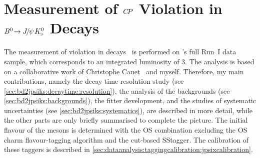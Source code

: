 
\chapter[Measurement of \texorpdfstring{$\CP$}{CP} Violation in
\texorpdfstring{$\BdToJPsiKS$}{Bd2JPsiKS} Decays]{Measurement of
\texorpdfstring{$\CP$}{CP} Violation in
\texorpdfstring{$\BdToJPsiKS$}{Bd2JPsiKS} Decays}
\label{sec:bd2jpsiks}

The measurement of \CP violation in \BdToJPsiKS
decays~\cite{LHCb-PAPER-2015-004} is performed on \lhcb's full Run~I data
sample, which corresponds to an integrated luminosity of \SI{3}{\invfb}. The
analysis is based on a collaborative work of Christophe
Cauet~\cite{Cauet-PhDThesis} and myself. Therefore, my main contributions,
namely the decay time resolution study (see
\cref{sec:bd2jpsiks:decaytime:resolution}), the analysis of the backgrounds
(see \cref{sec:bd2jpsiks:backgrounds}), the fitter development, and the
studies of systematic uncertainties (see \cref{sec:bd2jpsiks:systematics}),
are described in more detail, while the other parts are only briefly
summarised to complete the picture. The initial flavour of the \Bd mesons is
determined with the OS combination excluding the OS charm flavour-tagging
algorithm and the cut-based SS\pion tagger. The calibration of these taggers
is described in \cref{sec:dataanalysis:taggingcalibration:jpsixcalibration}.









